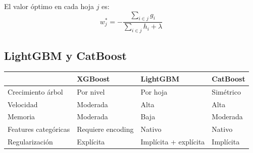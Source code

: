 \documentclass[12pt, a4paper]{article}
\begin{document}
El valor óptimo en cada hoja $j$ es:
\[
	w_j^* = -\frac{\sum_{i\in j} g_i}{\sum_{i\in j} h_i + \lambda}
\]

\subsection{LightGBM y CatBoost}

\begin{center}
	\begin{tabular}{llll}
		\toprule
		                     & \textbf{XGBoost}  & \textbf{LightGBM}     & \textbf{CatBoost} \\
		\midrule
		Crecimiento árbol    & Por nivel         & Por hoja              & Simétrico         \\
		Velocidad            & Moderada          & Alta                  & Alta              \\
		Memoria              & Moderada          & Baja                  & Moderada          \\
		Features categóricas & Requiere encoding & Nativo                & Nativo            \\
		Regularización       & Explícita         & Implícita + explícita & Implícita         \\
		\bottomrule
	\end{tabular}
\end{center}
\end{document}

